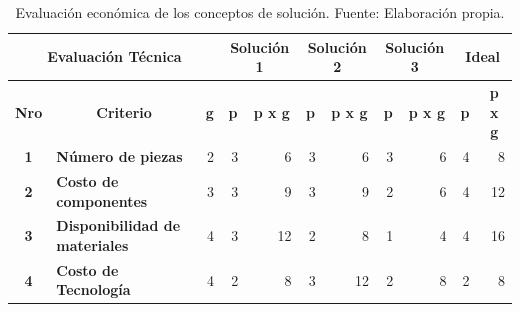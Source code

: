 \begin{table}[H]
	\centering
	\caption[Evaluación económica de los conceptos de solución.]{Evaluación económica de los conceptos de solución. Fuente: Elaboración propia.}
	\begin{tabular}{|c|c|c|c|c|c|c|c|c|c|c|}
		\hline
		\multicolumn{3}{|c|}{\textbf{Evaluación Técnica}} & \multicolumn{2}{c|}{\cellcolor[rgb]{ 1,  0,  0}\textcolor[rgb]{ 1,  1,  1}{\textbf{Solución 1}}} & \multicolumn{2}{c|}{\cellcolor[rgb]{ 0,  0,  1}\textcolor[rgb]{ 1,  1,  1}{\textbf{Solución 2}}} & \multicolumn{2}{c|}{\cellcolor[rgb]{ .298,  .835,  .078}\textbf{Solución 3}} & \multicolumn{2}{c|}{\cellcolor[rgb]{ 1,  .82,  .4}\textbf{Ideal}} \bigstrut\\
		\hline
		\textbf{Nro} & \textbf{Criterio} & \textbf{g} & \textbf{p} & \textbf{p x g} & \textbf{p} & \textbf{p x g} & \textbf{p} & \textbf{p x g} & \textbf{p} & \textbf{p x g} \bigstrut\\
		\hline
		\textbf{1} & \multicolumn{1}{l|}{\textbf{Número de piezas}} & \multicolumn{1}{r|}{2} & \multicolumn{1}{r|}{\cellcolor[rgb]{ .949,  .863,  .859}3} & \multicolumn{1}{r|}{6} & \multicolumn{1}{r|}{\cellcolor[rgb]{ .863,  .902,  .945}3} & \multicolumn{1}{r|}{6} & \multicolumn{1}{r|}{\cellcolor[rgb]{ .922,  .945,  .871}3} & \multicolumn{1}{r|}{6} & \multicolumn{1}{r|}{\cellcolor[rgb]{ .992,  .914,  .851}4} & \multicolumn{1}{r|}{8} \bigstrut\\
		\hline
		\textbf{2} & \multicolumn{1}{l|}{\textbf{Costo de componentes}} & \multicolumn{1}{r|}{3} & \multicolumn{1}{r|}{\cellcolor[rgb]{ .949,  .863,  .859}3} & \multicolumn{1}{r|}{9} & \multicolumn{1}{r|}{\cellcolor[rgb]{ .863,  .902,  .945}3} & \multicolumn{1}{r|}{9} & \multicolumn{1}{r|}{\cellcolor[rgb]{ .922,  .945,  .871}2} & \multicolumn{1}{r|}{6} & \multicolumn{1}{r|}{\cellcolor[rgb]{ .992,  .914,  .851}4} & \multicolumn{1}{r|}{12} \bigstrut\\
		\hline
		\textbf{3} & \multicolumn{1}{l|}{\textbf{Disponibilidad de materiales}} & \multicolumn{1}{r|}{4} & \multicolumn{1}{r|}{\cellcolor[rgb]{ .949,  .863,  .859}3} & \multicolumn{1}{r|}{12} & \multicolumn{1}{r|}{\cellcolor[rgb]{ .863,  .902,  .945}2} & \multicolumn{1}{r|}{8} & \multicolumn{1}{r|}{\cellcolor[rgb]{ .922,  .945,  .871}1} & \multicolumn{1}{r|}{4} & \multicolumn{1}{r|}{\cellcolor[rgb]{ .992,  .914,  .851}4} & \multicolumn{1}{r|}{16} \bigstrut\\
		\hline
		\textbf{4} & \multicolumn{1}{l|}{\textbf{Costo de Tecnología}} & \multicolumn{1}{r|}{4} & \multicolumn{1}{r|}{\cellcolor[rgb]{ .949,  .863,  .859}2} & \multicolumn{1}{r|}{8} & \multicolumn{1}{r|}{\cellcolor[rgb]{ .863,  .902,  .945}3} & \multicolumn{1}{r|}{12} & \multicolumn{1}{r|}{\cellcolor[rgb]{ .922,  .945,  .871}2} & \multicolumn{1}{r|}{8} & \multicolumn{1}{r|}{\cellcolor[rgb]{ .992,  .914,  .851}2} & \multicolumn{1}{r|}{8} \bigstrut\\

\end{tabular}
\end{table}
